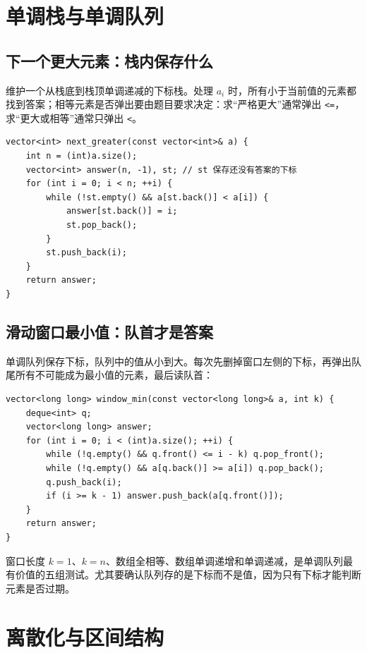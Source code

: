 \documentclass[UTF8,openany,oneside,zihao=-4]{ctexbook}
\begin{document}
\section{单调栈与单调队列}

\subsection{下一个更大元素：栈内保存什么}

维护一个从栈底到栈顶单调递减的下标栈。处理 $a_i$ 时，所有小于当前值的元素都找到答案；相等元素是否弹出要由题目要求决定：求“严格更大”通常弹出 \lstinline|<=|，求“更大或相等”通常只弹出 \lstinline|<|。

\begin{lstlisting}
vector<int> next_greater(const vector<int>& a) {
    int n = (int)a.size();
    vector<int> answer(n, -1), st; // st 保存还没有答案的下标
    for (int i = 0; i < n; ++i) {
        while (!st.empty() && a[st.back()] < a[i]) {
            answer[st.back()] = i;
            st.pop_back();
        }
        st.push_back(i);
    }
    return answer;
}
\end{lstlisting}

\subsection{滑动窗口最小值：队首才是答案}

单调队列保存下标，队列中的值从小到大。每次先删掉窗口左侧的下标，再弹出队尾所有不可能成为最小值的元素，最后读队首：

\begin{lstlisting}
vector<long long> window_min(const vector<long long>& a, int k) {
    deque<int> q;
    vector<long long> answer;
    for (int i = 0; i < (int)a.size(); ++i) {
        while (!q.empty() && q.front() <= i - k) q.pop_front();
        while (!q.empty() && a[q.back()] >= a[i]) q.pop_back();
        q.push_back(i);
        if (i >= k - 1) answer.push_back(a[q.front()]);
    }
    return answer;
}
\end{lstlisting}

\begin{note}
 窗口长度 $k=1$、$k=n$、数组全相等、数组单调递增和单调递减，是单调队列最有价值的五组测试。尤其要确认队列存的是下标而不是值，因为只有下标才能判断元素是否过期。
\end{note}

\section{离散化与区间结构}
\end{document}
